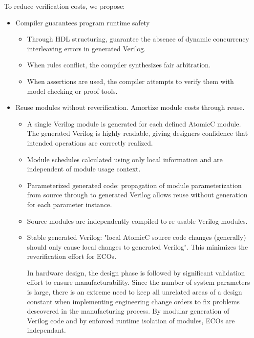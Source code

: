 To reduce verification costs, we propose:
\begin{itemize}
\item Compiler guarantees program runtime safety
\begin{itemize}
\item Through HDL structuring, guarantee the absence of dynamic concurrency interleaving errors in generated Verilog.
\item When rules conflict, the compiler synthesizes fair arbitration.
\item When assertions are used, the compiler attempts to verify them with model checking or proof tools.
\end{itemize}
\item Reuse modules without reverification.  Amortize module costs through reuse.
\begin{itemize}
\item A single Verilog module is generated for each defined AtomicC module.
The generated Verilog is highly readable, giving designers confidence that
intended operations are correctly realized.
\item Module schedules calculated using only local information and are independent of module usage context.
\item Parameterized generated code: propagation of module parameterization from
source through to generated Verilog allows reuse without generation for each parameter instance.
\item Source modules are independently compiled to re-usable Verilog modules.
\item Stable generated Verilog: "local AtomicC source code changes (generally) should only cause local changes to generated Verilog".
This minimizes the reverification effort for ECOs.

In hardware design, the design phase is followed by significant validation effort
to ensure manufacturability.  Since the number of system parameters is
large, there is an extreme need to keep all unrelated areas of a design constant
when implementing engineering change orders to fix problems descovered
in the manufacturing process.
By modular generation of Verilog code and by enforced runtime isolation
of modules, ECOs are independant.

\end{itemize}


\end{itemize}
